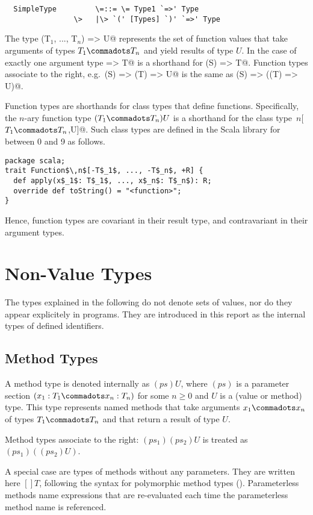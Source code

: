 \documentclass[11pt]{report}
\begin{document}
\syntax\begin{verbatim}
  SimpleType         \=::= \= Type1 `=>' Type
                \>   |\> `(' [Types] `)' `=>' Type
\end{verbatim}
The type \verb@(T$_1$, ..., T$_n$) => U@ represents the set of function
values that take arguments of types $T_1 \commadots T_n$ and yield
results of type $U$.  In the case of exactly one argument type
\verb@S => T@ is a shorthand for \verb@(S) => T@.  Function types
associate to the right, e.g.\ \verb@(S) => (T) => U@ is the same as
\verb@(S) => ((T) => U)@.

Function types are shorthands for class types that define \verb@apply@
functions.  Specifically, the $n$-ary function type $(T_1 \commadots
T_n)U$ is a shorthand for the class type
\verb@Function$\,n$[$T_1 \commadots T_n$,U]@. Such class
types are defined in the Scala library for \verb@n@ between 0 and 9 as follows.
\begin{verbatim}
package scala;
trait Function$\,n$[-T$_1$, ..., -T$_n$, +R] {
  def apply(x$_1$: T$_1$, ..., x$_n$: T$_n$): R;
  override def toString() = "<function>";
}
\end{verbatim}
Hence, function types are covariant in their result type, and
contravariant in their argument types.

\section{Non-Value Types}
\label{sec:synthetic-types}

The types explained in the following do not denote sets of values, nor
do they appear explicitely in programs. They are introduced in this
report as the internal types of defined identifiers.

\subsection{Method Types}
\label{sec:method-types}

A method type is denoted internally as $(ps)U$, where $(ps)$ is a
parameter section $(x_1: T_1 \commadots x_n: T_n)$ for some $n \geq 0$
and $U$ is a (value or method) type.  This type represents named
methods that take arguments $x_1 \commadots x_n$ of types $T_1
\commadots T_n$ and that return a result of type $U$.

Method types associate to the right: $(ps_1)(ps_2)U$ is treated as
$(ps_1)((ps_2)U)$.

A special case are types of methods without any parameters. They are
written here $[]T$, following the syntax for polymorphic method types
(). Parameterless methods name expressions that
are re-evaluated each time the parameterless method name is
referenced.
\end{document}
